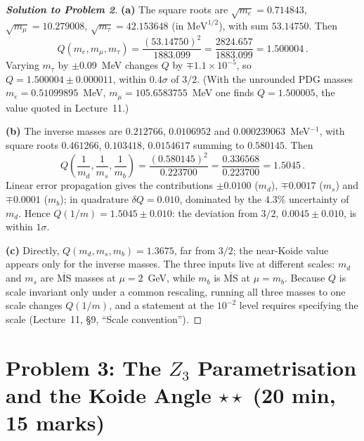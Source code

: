 \documentclass[11pt,a4paper]{article}
\begin{document}
\begin{proof}[\textbf{Solution to Problem 2}]

\textbf{(a)} The square roots are $\sqrt{m_e} = 0.714843$,
$\sqrt{m_\mu} = 10.279008$, $\sqrt{m_\tau} = 42.153648$
(in $\text{MeV}^{1/2}$), with sum $53.14750$.  Then
\begin{equation*}
  Q(m_e,m_\mu,m_\tau) = \frac{(53.14750)^2}{1883.099}
  = \frac{2824.657}{1883.099} = 1.500004\,.
\end{equation*}
Varying $m_\tau$ by $\pm 0.09$~MeV changes $Q$ by
$\mp 1.1\times 10^{-5}$, so $Q = 1.500004 \pm 0.000011$, within
$0.4\sigma$ of $3/2$.  (With the unrounded PDG masses
$m_e = 0.51099895$~MeV, $m_\mu = 105.6583755$~MeV one finds
$Q = 1.500005$, the value quoted in Lecture~11.)

\medskip

\textbf{(b)} The inverse masses are $0.212766$, $0.0106952$ and
$0.000239063$~MeV$^{-1}$, with square roots $0.461266$, $0.103418$,
$0.0154617$ summing to $0.580145$.  Then
\begin{equation*}
  Q\!\left(\frac{1}{m_d},\frac{1}{m_s},\frac{1}{m_b}\right)
  = \frac{(0.580145)^2}{0.223700} = \frac{0.336568}{0.223700}
  = 1.5045\,.
\end{equation*}
Linear error propagation gives the contributions $\pm 0.0100$
($m_d$), $\mp 0.0017$ ($m_s$) and $\mp 0.0001$ ($m_b$); in
quadrature $\delta Q = 0.010$, dominated by the $4.3\%$ uncertainty
of $m_d$.  Hence $Q(1/m) = 1.5045 \pm 0.010$: the deviation from
$3/2$, $0.0045 \pm 0.010$, is within $1\sigma$.

\medskip

\textbf{(c)} Directly, $Q(m_d,m_s,m_b) = 1.3675$, far from $3/2$; the
near-Koide value appears only for the inverse masses.  The three
inputs live at different scales: $m_d$ and $m_s$ are
$\overline{\text{MS}}$ masses at $\mu = 2$~GeV, while $m_b$ is
$\overline{\text{MS}}$ at $\mu = m_b$.  Because $Q$ is scale invariant
only under a common rescaling, running all three masses to one scale
changes $Q(1/m)$, and a statement at the $10^{-2}$ level requires
specifying the scale (Lecture~11, \S9, ``Scale convention'').

\end{proof}


\bigskip

\section*{Problem 3: The $Z_3$ Parametrisation and the Koide Angle
  \hfill $\star\star$ \normalsize(20 min, 15 marks)}
\label{prob:z3}
\end{document}
